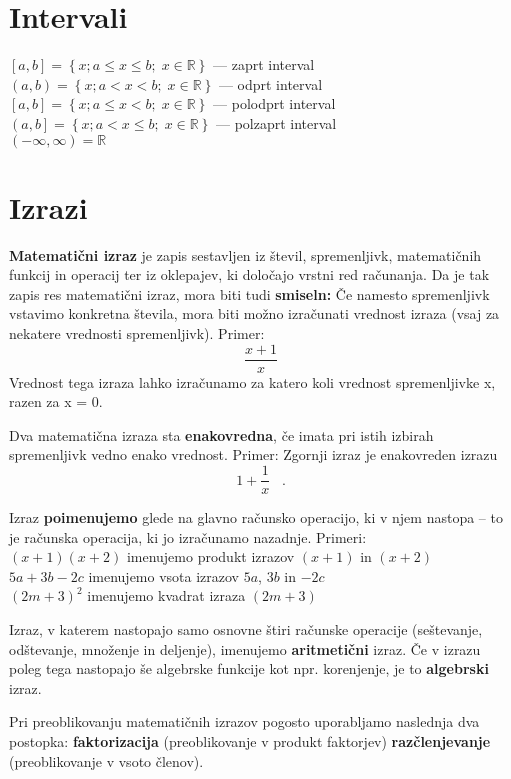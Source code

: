 \documentclass[a4paper,oneside,12pt,fleqn]{article}
\def\R{\ensuremath{\mathbb R}}
\newcommand{\edot}{\;\;\;.}
\numberwithin{equation}{section}
\begin{document}
\section{Intervali}
\label{sec:intervali}
$\left[a,b \right] = \left\{x; a \leq x \leq b; \; x \in \R \right\}$ --- zaprt interval \\
$\left(a,b \right) = \left\{x; a < x < b; \; x \in \R \right\}$ --- odprt interval \\
$\left[a,b \right] = \left\{x; a \leq x < b; \; x \in \R \right\}$ --- polodprt interval \\
$\left(a,b \right] = \left\{x; a < x \leq b; \; x \in \R \right\}$ --- polzaprt interval \\
$(-\infty,\infty) = \R$

\section{Izrazi}
\textbf{Matematični izraz} je zapis sestavljen iz števil, spremenljivk, matematičnih funkcij in
operacij ter iz oklepajev, ki določajo vrstni red računanja. Da je tak zapis res
matematični izraz, mora biti tudi \textbf{smiseln:} Če namesto spremenljivk vstavimo konkretna
števila, mora biti možno izračunati vrednost izraza (vsaj za nekatere vrednosti
spremenljivk).
Primer:
\[ \frac{x + 1}{x} \]
Vrednost tega izraza lahko izračunamo za katero koli vrednost
spremenljivke x, razen za x = 0.

Dva matematična izraza sta \textbf{enakovredna}, če imata pri istih izbirah spremenljivk vedno
enako vrednost.
Primer: Zgornji izraz je enakovreden izrazu 
\[ 1 + \frac{1}{x} \edot \]

Izraz \textbf{poimenujemo} glede na glavno računsko operacijo, ki v njem nastopa -- to je računska
operacija, ki jo izračunamo nazadnje.
Primeri: \\
$(x + 1)(x + 2)$ imenujemo produkt izrazov $(x + 1)$ in $(x + 2)$ \\
$5a + 3b - 2c$ imenujemo vsota izrazov $5a$, $3b$ in $-2c$ \\
$(2m + 3)^2$ imenujemo kvadrat izraza $(2m + 3)$

Izraz, v katerem nastopajo samo osnovne štiri računske operacije (seštevanje, odštevanje,
množenje in deljenje), imenujemo \textbf{aritmetični} izraz. Če v izrazu poleg tega nastopajo še
algebrske funkcije kot npr. korenjenje, je to \textbf{algebrski} izraz.

Pri preoblikovanju matematičnih izrazov pogosto uporabljamo naslednja dva postopka:
\textbf{faktorizacija} (preoblikovanje v produkt faktorjev)
\textbf{razčlenjevanje} (preoblikovanje v vsoto členov).
\end{document}

